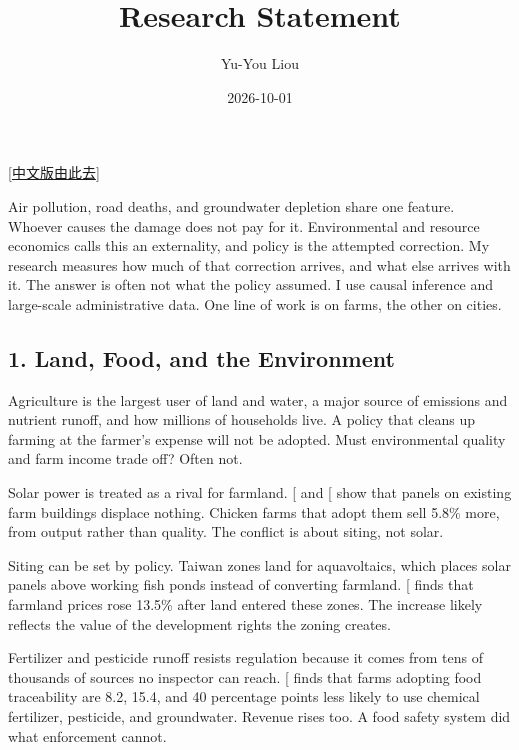 \documentclass[
  11pt,
]{article}
\title{\textbf{Research Statement}}
\author{Yu-You Liou}
\date{2026-10-01}
\begin{document}
\maketitle

{\raggedleft\small[\href{https://yyliou.github.io/yyliou/rs/rs_zh.pdf}{中文版由此去}]\par}

Air pollution, road deaths, and groundwater depletion share one feature.
Whoever causes the damage does not pay for it. Environmental and
resource economics calls this an externality, and policy is the
attempted correction. My research measures how much of that correction
arrives, and what else arrives with it. The answer is often not what the
policy assumed. I use causal inference and large-scale administrative
data. One line of work is on farms, the other on cities.

\subsection{1. Land, Food, and the
Environment}\label{land-food-and-the-environment}

Agriculture is the largest user of land and water, a major source of
emissions and nutrient runoff, and how millions of households live. A
policy that cleans up farming at the farmer's expense will not be
adopted. Must environmental quality and farm income trade off? Often
not.

Solar power is treated as a rival for farmland.
{[}\citeproc{ref-liou2025rooftop}{1}{]} and
{[}\citeproc{ref-lee2025solar}{2}{]} show that panels on existing farm
buildings displace nothing. Chicken farms that adopt them sell 5.8\%
more, from output rather than quality. The conflict is about siting, not
solar.

Siting can be set by policy. Taiwan zones land for aquavoltaics, which
places solar panels above working fish ponds instead of converting
farmland. {[}\citeproc{ref-chang2026aquavoltaics}{3}{]} finds that
farmland prices rose 13.5\% after land entered these zones. The increase
likely reflects the value of the development rights the zoning creates.

Fertilizer and pesticide runoff resists regulation because it comes from
tens of thousands of sources no inspector can reach.
{[}\citeproc{ref-chang2026food}{4}{]} finds that farms adopting food
traceability are 8.2, 15.4, and 40 percentage points less likely to use
chemical fertilizer, pesticide, and groundwater. Revenue rises too. A
food safety system did what enforcement cannot.
\end{document}
